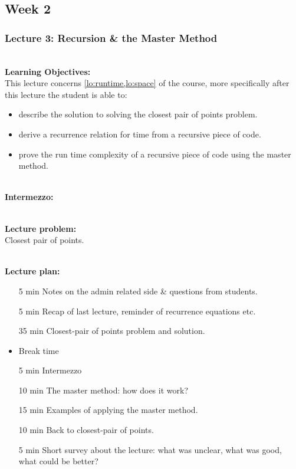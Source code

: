 \subsection{Week 2}
\label{sub:week_2}

\subsubsection{Lecture 3: Recursion \& the Master Method}
\label{sub:lecture_3}

\hfill\\
\textbf{Learning Objectives:}\\
This lecture concerns \cref{lo:runtime,lo:space} of the course, more specifically after this lecture the student is able
to:
\begin{itemize}
	\item describe the solution to solving the closest pair of points problem.
	\item derive a recurrence relation for time from a recursive piece of code.
	\item prove the run time complexity of a recursive piece of code using the master method.
\end{itemize}

\hfill\\
\textbf{Intermezzo:}\\

\hfill\\
\textbf{Lecture problem:}\\
Closest pair of points.

\hfill\\
\textbf{Lecture plan:}\\
\begin{itemize}
	\item[5 min] Notes on the admin related side \& questions from students.
	\item[5 min] Recap of last lecture, reminder of recurrence equations etc.
	\item[35 min] Closest-pair of points problem and solution.
	\item Break time
	\item[5 min] Intermezzo
	\item[10 min] The master method: how does it work?
	\item[15 min] Examples of applying the master method.
	\item[10 min] Back to closest-pair of points.
	\item[5 min] Short survey about the lecture: what was unclear, what was good, what could be better?
\end{itemize}

